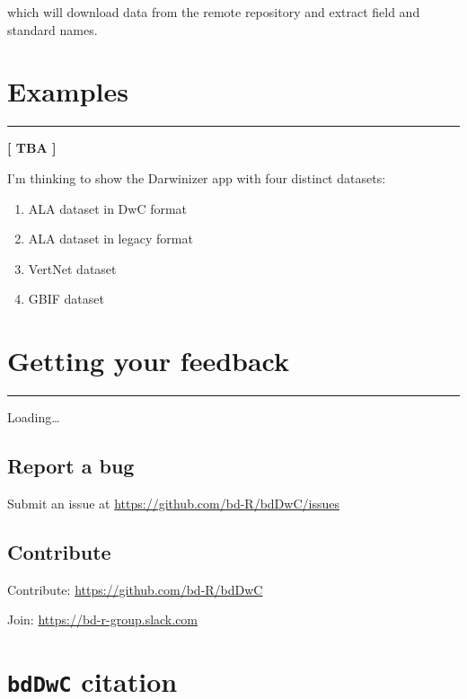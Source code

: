\documentclass[]{book}
\providecommand{\tightlist}{%
  \setlength{\itemsep}{0pt}\setlength{\parskip}{0pt}}
\theoremstyle{definition}
\theoremstyle{definition}
\theoremstyle{definition}
\theoremstyle{remark}
\begin{document}
which will download data from the remote repository and extract field
and standard names.

\chapter{Examples}\label{examples}

\begin{center}\rule{0.5\linewidth}{\linethickness}\end{center}

\textbf{{{[} TBA {]}}}

I'm thinking to show the Darwinizer app with four distinct datasets:

\begin{enumerate}
\def\labelenumi{\arabic{enumi}.}
\tightlist
\item
  ALA dataset in DwC format
\item
  ALA dataset in legacy format
\item
  VertNet dataset
\item
  GBIF dataset
\end{enumerate}

\chapter{Getting your feedback}\label{getting-your-feedback}

\begin{center}\rule{0.5\linewidth}{\linethickness}\end{center}

Loading\ldots{}

\section{Report a bug}\label{report-a-bug}

Submit an issue at \url{https://github.com/bd-R/bdDwC/issues}

\section{Contribute}\label{contribute}

Contribute: \url{https://github.com/bd-R/bdDwC}

Join: \url{https://bd-r-group.slack.com}

\chapter{\texorpdfstring{\texttt{bdDwC}
citation}{bdDwC citation}}\label{bddwc-citation}
\end{document}
